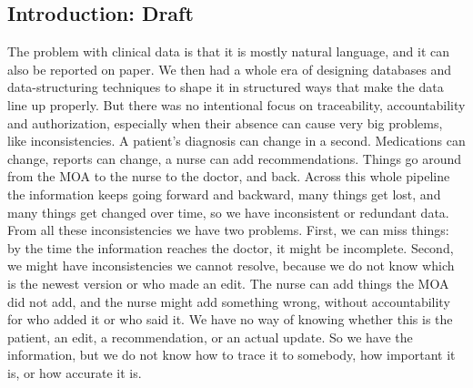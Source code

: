 \documentclass[sigconf]{acmart}
\begin{document}
\subsection{Introduction: Draft}
The problem with clinical data is that it is mostly natural language, and it can also be reported on paper. We then had a whole era of designing databases and data-structuring techniques to shape it in structured ways that make the data line up properly. But there was no intentional focus on traceability, accountability and authorization, especially when their absence can cause very big problems, like inconsistencies. A patient's diagnosis can change in a second. Medications can change, reports can change, a nurse can add recommendations. Things go around from the MOA to the nurse to the doctor, and back. Across this whole pipeline the information keeps going forward and backward, many things get lost, and many things get changed over time, so we have inconsistent or redundant data. From all these inconsistencies we have two problems. First, we can miss things: by the time the information reaches the doctor, it might be incomplete. Second, we might have inconsistencies we cannot resolve, because we do not know which is the newest version or who made an edit. The nurse can add things the MOA did not add, and the nurse might add something wrong, without accountability for who added it or who said it. We have no way of knowing whether this is the patient, an edit, a recommendation, or an actual update. So we have the information, but we do not know how to trace it to somebody, how important it is, or how accurate it is.
\end{document}
